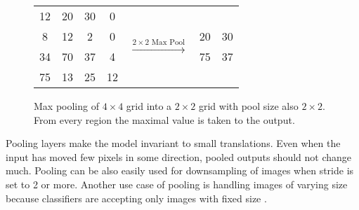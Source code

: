 \begin{figure}[!ht]
    \renewcommand{\arraystretch}{1.6}
    
    \centering
    \begin{tabular}{|c|c|c|c| c c c}
        \cline{1-4}
            \cellcolor{red!30}12 & \cellcolor{red!30}20 & \cellcolor{yellow!30}30 & \cellcolor{yellow!30}0 & & & \\ 
        \cline{1-4} \cline{6-7}
            \cellcolor{red!30}8 & \cellcolor{red!30}12 & \cellcolor{yellow!30}2 & \cellcolor{yellow!30}0 & \multirow{2}{*}{$\xrightarrow{2 \times 2 \text{ Max Pool}}$} & \multicolumn{1}{|c|}{\cellcolor{red!30}20} & \multicolumn{1}{c|}{\cellcolor{yellow!30}30} \\
        \cline{1-4} \cline{6-7}
            \cellcolor{blue!30}34 & \cellcolor{blue!30}70 & \cellcolor{green!30}37 & \cellcolor{green!30}4 & & \multicolumn{1}{|c|}{\cellcolor{blue!30}75} & \multicolumn{1}{c|}{\cellcolor{green!30}37} \\
        \cline{1-4} \cline{6-7}
            \cellcolor{blue!30}75 & \cellcolor{blue!30}13 & \cellcolor{green!30}25 & \cellcolor{green!30}12 & & & \\
        \cline{1-4}
    \end{tabular}
    \caption{Max pooling of $4 \times 4$ grid into a $2 \times 2$ grid with pool size also $2 \times 2$. From every region the maximal value is taken to the output.}
    \label{fig:pooling}
\end{figure}

Pooling layers make the model invariant to small translations. Even when the input has moved few pixels in some direction, pooled outputs should not change much. Pooling can be also easily used for downsampling of images when stride is set to 2 or more. Another use case of pooling is handling images of varying size because classifiers are accepting only images with fixed size \cite{Goodfellow-et-al-2016}.


